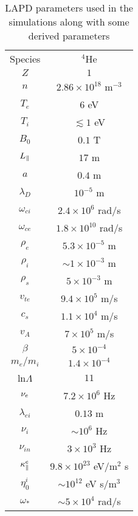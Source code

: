 \begin{table}
\label{parameter_table}
\setlength{\tabcolsep}{60pt}
\begin{tabular}{| c c |}
\hline \hline
Species & $^4$He \\
$Z$ & $1$ \\
$n$ & $2.86 \times 10^{18}$ m$^{-3}$ \\
$T_e$ & $6$ eV \\
$T_i$ & $\lesssim 1$ eV \\
$B_0$ & $0.1$ T \\
$L_\parallel$ & $17$ m \\
$a$ & $0.4$ m \\
$\lambda_D$ & $10^{-5}$ m \\
$\omega_{ci}$ & $2.4 \times 10^6$ rad/s \\
$\omega_{ce}$ & $1.8 \times 10^{10}$ rad/s \\
$\rho_e$ & $ 5.3 \times 10^{-5}$ m \\
$\rho_i$ & $\sim 1 \times 10^{-3}$ m \\
$\rho_s$ & $5 \times 10^{-3}$ m \\
$v_{te}$ & $9.4 \times 10^{5}$ m/s \\
$c_s$ & $1.1 \times 10^4$ m/s \\
$v_A$ & $7 \times 10^5$ m/s \\
$\beta$ & $5 \times 10^{-4}$ \\
$m_e/m_i$ & $1.4 \times 10^{-4}$ \\
ln$\Lambda$ & $11$ \\
$\nu_{e}$ & $7.2 \times 10^6$ Hz \\
$\lambda_{ei}$ & $0.13$ m \\
$\nu_i$ & $\sim 10^6$ Hz \\
$\nu_{in}$ & $3 \times 10^3$ Hz \\
$\kappa_\parallel^e$ & $9.8 \times 10^{23}$ eV/m$^2$ s \\
$\eta_0^i$ & $\sim 10^{12}$ eV s/m$^3$ \\
$\omega_{*}$ & $\sim 5 \times 10^4$ rad/s \\
\hline \hline
\end{tabular}
\caption{LAPD parameters used in the simulations along with some derived parameters}
\end{table}
